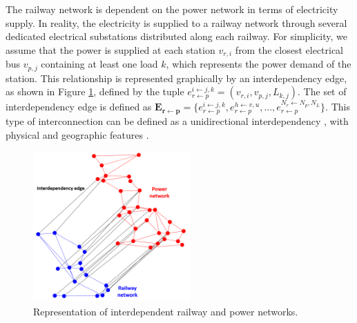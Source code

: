\documentclass[review]{elsarticle}
\begin{document}
	The railway network is dependent on the power network in terms of electricity supply. In reality, the electricity is supplied to a railway network through several dedicated electrical substations distributed along each railway. For simplicity, we assume that the power is supplied at each station $v_{r,i}$ from the closest electrical bus $v_{p,j}$ containing at least one load $k$, which represents the power demand of the station. This relationship is represented graphically by an interdependency edge, as shown in Figure \ref{NoN}, defined by the tuple $e^{i \leftarrow j,k}_{r\leftarrow p} = (v_{r,i}, v_{p,j}, L_{k,j})$. The set of interdependency edge is defined as $\mathbf{E_{r \leftarrow p}}=\{ e_{r \leftarrow p}^{i \leftarrow j,k}, e_{r \leftarrow p}^{h \leftarrow v,u},...,e_{r \leftarrow p}^{N_r \leftarrow N_p, N_L} \}$. This type of interconnection can be defined as a unidirectional interdependency \cite{johansson2011vulnerability}\cite{mcdaniels2007empirical}, with physical and geographic features \cite{rinaldi2001identifying}.
\begin{figure}[ht]
	\centering
	\includegraphics[width=6cm]{ images/NoN.png}
	\caption{Representation of interdependent railway and power networks.}
	\label{NoN}
\end{figure}	
\end{document}
